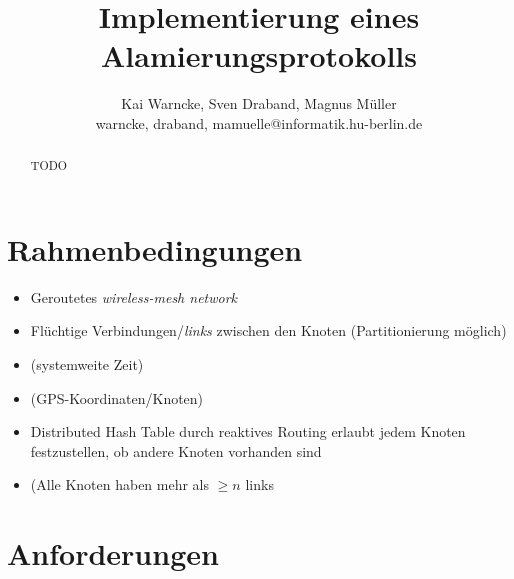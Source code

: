 \documentclass[a4paper,10pt,fleqn]{scrartcl}
\title{Implementierung eines Alamierungsprotokolls}
\author{Kai Warncke, Sven Draband, Magnus Müller \\
{warncke, draband, mamuelle}@informatik.hu-berlin.de
}
\theoremstyle{break}
\begin{document}
\maketitle
\tableofcontents
\begin{abstract}
  TODO
\end{abstract}
\section{Rahmenbedingungen}
    \begin{itemize}
      \item Geroutetes \emph{wireless-mesh network}
      \item Flüchtige Verbindungen/\emph{links} zwischen den Knoten (Partitionierung
        möglich)
      \item (systemweite Zeit)
      \item (GPS-Koordinaten/Knoten)
      \item Distributed Hash Table durch reaktives Routing erlaubt jedem Knoten
        festzustellen, ob andere Knoten vorhanden sind
      \item (Alle Knoten haben mehr als $\geq n$ links
    \end{itemize}
\section{Anforderungen}
\end{document}

